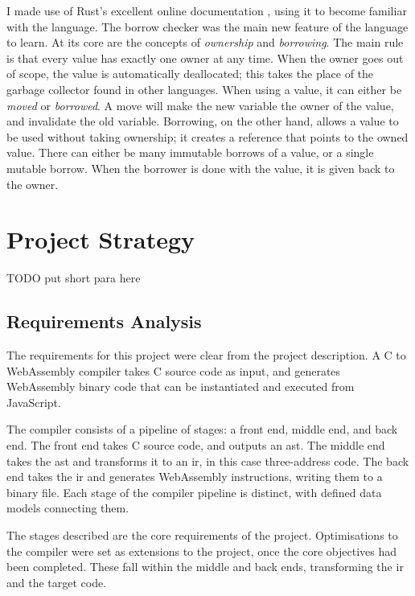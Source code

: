 \documentclass[00-main.tex]{subfiles}
\begin{document}
I made use of Rust's excellent online documentation , using it to become familiar with the language.
The borrow checker was the main new feature of the language to learn.
At its core are the concepts of \emph{ownership} and \emph{borrowing}.
The main rule is that every value has exactly one owner at any time.
When the owner goes out of scope, the value is automatically deallocated; this takes the place of the garbage collector found in other languages.
When using a value, it can either be \emph{moved} or \emph{borrowed}.
A move will make the new variable the owner of the value, and invalidate the old variable.
Borrowing, on the other hand, allows a value to be used without taking ownership; it creates a reference that points to the owned value.
There can either be many immutable borrows of a value, or a single mutable borrow.
When the borrower is done with the value, it is given back to the owner.


\section{Project Strategy}

\begin{mrwComment}
TODO put short para here
\end{mrwComment}

\subsection{Requirements Analysis}

The requirements for this project were clear from the project description.
A C to WebAssembly compiler takes C source code as input, and generates WebAssembly binary code that can be instantiated and executed from JavaScript.

The compiler consists of a pipeline of stages: a front end, middle end, and back end.
The front end takes C source code, and outputs an \gls{ast}.
The middle end takes the \gls{ast} and transforms it to an \gls{ir}, in this case three-address code.
The back end takes the \gls{ir} and generates WebAssembly instructions, writing them to a binary file.
Each stage of the compiler pipeline is distinct, with defined data models connecting them.

The stages described are the core requirements of the project.
Optimisations to the compiler were set as extensions to the project, once the core objectives had been completed.
These fall within the middle and back ends, transforming the \gls{ir} and the target code.
\end{document}
